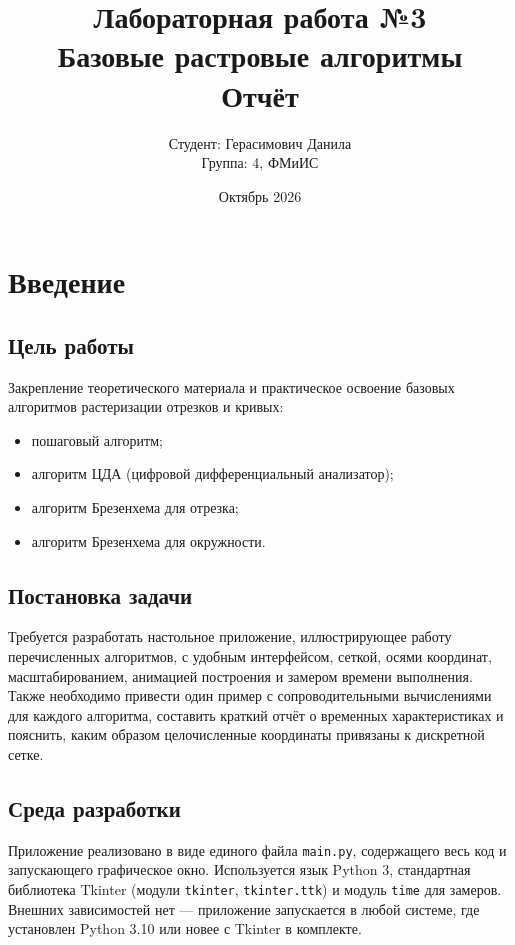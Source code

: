 \documentclass[a4paper,14pt]{extarticle}
\title{
  \vspace{-2cm}
  \textbf{Лабораторная работа №3}\\[0.3cm]
  \textbf{Базовые растровые алгоритмы}\\[0.6cm]
  \large Отчёт
}
\author{Студент: Герасимович Данила\\
        Группа: 4, ФМиИС}
\date{Октябрь 2026}
\begin{document}
\maketitle

\tableofcontents
\newpage

\section{Введение}

\subsection{Цель работы}
Закрепление теоретического материала и практическое освоение базовых алгоритмов растеризации отрезков и кривых:
\begin{itemize}
  \item пошаговый алгоритм;
  \item алгоритм ЦДА (цифровой дифференциальный анализатор);
  \item алгоритм Брезенхема для отрезка;
  \item алгоритм Брезенхема для окружности.
\end{itemize}

\subsection{Постановка задачи}
Требуется разработать настольное приложение, иллюстрирующее работу перечисленных алгоритмов, с удобным интерфейсом, сеткой, осями координат, масштабированием, анимацией построения и замером времени выполнения. Также необходимо привести один пример с сопроводительными вычислениями для каждого алгоритма, составить краткий отчёт о временных характеристиках и пояснить, каким образом целочисленные координаты привязаны к дискретной сетке.

\subsection{Среда разработки}
Приложение реализовано в виде единого файла \texttt{main.py}, содержащего весь код и запускающего графическое окно. Используется язык Python 3, стандартная библиотека Tkinter (модули \texttt{tkinter}, \texttt{tkinter.ttk}) и модуль \texttt{time} для замеров. Внешних зависимостей нет — приложение запускается в любой системе, где установлен Python 3.10 или новее с Tkinter в комплекте.
\end{document}
